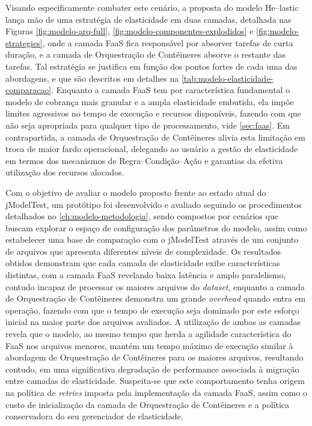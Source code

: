 \documentclass[english,brazilian]{UNISINOSmonografia} %
\begin{document}
Visando especificamente combater este cenário, a proposta do modelo \textsf{He}--lastic lança mão de uma estratégia de elasticidade em duas camadas, detalhada nas Figuras \ref{fig:modelo-arq-full}, \ref{fig:modelo-componentes-explodidos} e \ref{fig:modelo-strategies}, onde a camada FaaS fica responsável por absorver tarefas de curta duração, e a camada de Orquestração de Contêineres absorve o restante das tarefas.
Tal estratégia se justifica em função dos pontos fortes de cada uma das abordagens, e que são descritos em detalhes na \autoref{tab:modelo-elasticidade-comparacao}.
Enquanto a camada FaaS tem por característica fundamental o modelo de cobrança mais granular e a ampla elasticidade embutida, ela impõe limites agressivos no tempo de execução e recursos disponíveis, fazendo com que não seja apropriada para qualquer tipo de processamento, vide \mbox{\autoref{sec:faas}}.
Em contrapartida, a camada de Orquestração de Contêineres alivia esta limitação em troca de maior fardo operacional, delegando ao usuário a gestão de elasticidade em termos dos mecanismos de Regra--Condição--Ação e garantias da efetiva utilização dos recursos alocados.


Com o objetivo de avaliar o modelo proposto frente ao estado atual do jModelTest, um protótipo foi desenvolvido e avaliado seguindo os procedimentos detalhados no \autoref{ch:modelo-metodologia}, sendo compostos por cenários que buscam explorar o espaço de configuração dos parâmetros do modelo, assim como estabelecer uma base de comparação com o jModelTest através de um conjunto de arquivos que apresenta diferentes níveis de complexidade.
Os resultados obtidos demonstram que cada camada de elasticidade exibe características distintas, com a camada FaaS revelando baixa latência e amplo paralelismo, contudo incapaz de processar os maiores arquivos do \textit{dataset}, enquanto a camada de Orquestração de Contêineres demonstra um grande \textit{overhead} quando entra em operação, fazendo com que o tempo de execução seja dominado por este esforço inicial na maior parte dos arquivos avaliados.
A utilização de ambas as camadas revela que o modelo, ao mesmo tempo que herda a agilidade característica do FaaS nos arquivos menores, mantém um tempo máximo de execução similar à abordagem de Orquestração de Contêineres para os maiores arquivos, resultando contudo, em uma significativa degradação de performance associada à migração entre camadas de elasticidade.
Suspeita-se que este comportamento tenha origem na política de \textit{retries} imposta pela implementação da camada FaaS, assim como o custo de inicialização da camada de Orquestração de Contêineres e a política conservadora do seu gerenciador de elasticidade.
\end{document}
